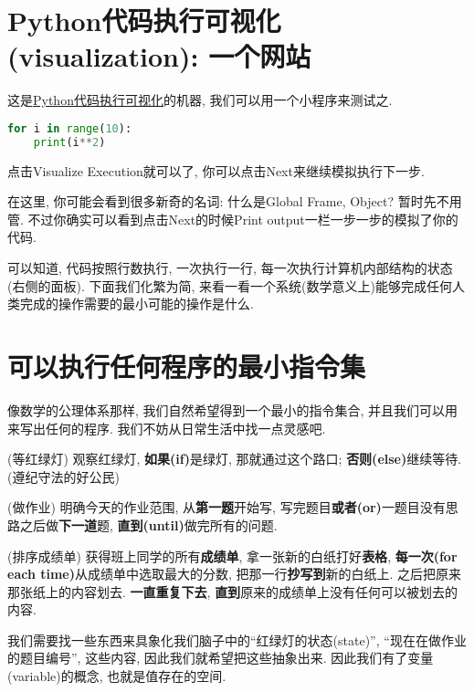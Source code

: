 \section{Python代码执行可视化(visualization): 一个网站}

\begin{tool}
这是\href{https://pythontutor.com/visualize.html\#mode=display}{Python代码执行可视化}的机器,
我们可以用一个小程序来测试之.
\begin{lstlisting}[language=python]
for i in range(10):
    print(i**2)
\end{lstlisting}

点击Visualize Execution就可以了, 你可以点击Next来继续模拟执行下一步.

在这里, 你可能会看到很多新奇的名词: 什么是Global Frame, Object? 暂时先不用管. 不过你确实可以看到点击Next的时候Print output一栏一步一步的模拟了你的代码. 
\end{tool}

可以知道, 代码按照行数执行, 一次执行一行, 每一次执行计算机内部结构的状态(右侧的面板). 下面我们化繁为简, 来看一看一个系统(数学意义上)能够完成任何人类完成的操作需要的最小可能的操作是什么. 

\section{可以执行任何程序的最小指令集}
像数学的公理体系那样, 我们自然希望得到一个最小的指令集合, 并且我们可以用来写出任何的程序. 我们不妨从日常生活中找一点灵感吧.
\begin{example}
(等红绿灯) 观察红绿灯, \textbf{如果(if)}是绿灯, 那就通过这个路口; \textbf{否则(else)}继续等待. (遵纪守法的好公民)

(做作业) 明确今天的作业范围, 从\textbf{第一题}开始写, 写完题目\textbf{或者(or)}一题目没有思路之后做\textbf{下一道}题,
\textbf{直到(until)}做完所有的问题.

(排序成绩单) 获得班上同学的所有\textbf{成绩单}, 拿一张新的白纸打好\textbf{表格}, \textbf{每一次(for each time)}从成绩单中选取最大的分数,
把那一行\textbf{抄写到}新的白纸上. 之后把原来那张纸上的内容划去. \textbf{一直重复下去}, \textbf{直到}原来的成绩单上没有任何可以被划去的内容.
\end{example}
我们需要找一些东西来具象化我们脑子中的``红绿灯的状态(state)'', ``现在在做作业的题目编号'', 这些内容, 因此我们就希望把这些抽象出来.
因此我们有了变量(variable)的概念, 也就是值存在的空间. 

